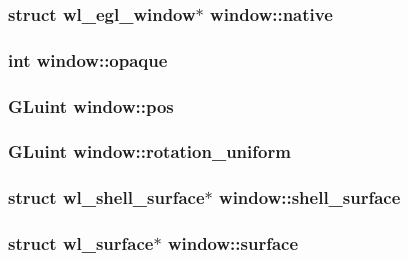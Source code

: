 \hypertarget{structwindow_ae41be0955d0e73530e1bc13dfeb9d731}{
\subsubsection[{native}]{\setlength{\rightskip}{0pt plus 5cm}struct wl\-\_\-egl\-\_\-window$\ast$ window\-::native}}\label{structwindow_ae41be0955d0e73530e1bc13dfeb9d731}
\hypertarget{structwindow_a026a50808d8323a5a73d585c19916fa8}{
\subsubsection[{opaque}]{\setlength{\rightskip}{0pt plus 5cm}int window\-::opaque}}\label{structwindow_a026a50808d8323a5a73d585c19916fa8}
\hypertarget{structwindow_aaf965f90f9fc938db2315ff62028c362}{
\subsubsection[{pos}]{\setlength{\rightskip}{0pt plus 5cm}G\-Luint window\-::pos}}\label{structwindow_aaf965f90f9fc938db2315ff62028c362}
\hypertarget{structwindow_a5202f3b60e262a6fa4fcee68dd47cb67}{
\subsubsection[{rotation\-\_\-uniform}]{\setlength{\rightskip}{0pt plus 5cm}G\-Luint window\-::rotation\-\_\-uniform}}\label{structwindow_a5202f3b60e262a6fa4fcee68dd47cb67}
\hypertarget{structwindow_ae4cdc06e4406bc9c168e4a71dcba1103}{
\subsubsection[{shell\-\_\-surface}]{\setlength{\rightskip}{0pt plus 5cm}struct wl\-\_\-shell\-\_\-surface$\ast$ window\-::shell\-\_\-surface}}\label{structwindow_ae4cdc06e4406bc9c168e4a71dcba1103}
\hypertarget{structwindow_a7d0790cfc7c30621611fa26ab5c1ae97}{
\subsubsection[{surface}]{\setlength{\rightskip}{0pt plus 5cm}struct wl\-\_\-surface$\ast$ window\-::surface}}\label{structwindow_a7d0790cfc7c30621611fa26ab5c1ae97}
